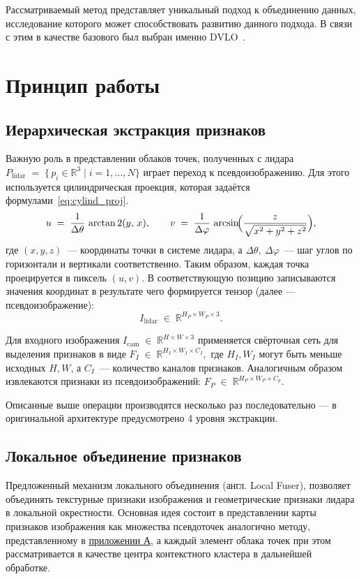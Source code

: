 Рассматриваемый метод представляет уникальный подход к объединению данных, исследование которого
может способствовать развитию данного подхода. В связи с этим в качестве базового был выбран
именно DVLO~\cite{liu2024dvlo}.

\section{Принцип работы}
\subsection{Иерархическая экстракция признаков}
Важную роль в представлении облаков точек, полученных с лидара ${P}_{\mathrm{lidar}} \;=\; \bigl\{\,{p}_i \in \mathbb{R}^3 \mid i=1,\ldots,N\bigr\}$
играет переход к псевдоизображению. Для этого используется цилиндрическая проекция, которая задаётся формулами~\eqref{eq:cylind_proj}.
\begin{equation}
  \label{eq:cylind_proj}
  u \;=\; \frac{1}{\Delta \theta}\,\arctan2(y,\,x),
  \qquad
  v \;=\; \frac{1}{\Delta \varphi}\,\arcsin\!\Bigl(\frac{z}{\sqrt{x^2 + y^2 + z^2}}\Bigr),
\end{equation}
где $(x,y,z)$~--- координаты точки в системе лидара, а
$\Delta \theta,\ \Delta \varphi$~--- шаг углов по горизонтали и вертикали соответственно.
Таким образом, каждая точка проецируется в пиксель $(u,v)$.
В соответствующую позицию записываются значения координат в результате чего формируется тензор (далее --- псевдоизображение):
\begin{equation*}
  {I}_{\mathrm{lidar}} \;\in\; \mathbb{R}^{H_P \times W_P \times 3}.
\end{equation*}

Для входного изображения ${I}_{\mathrm{cam}} \;\in\; \mathbb{R}^{H \times W \times 3}$
применяется свёрточная сеть для выделения признаков в виде ${F}_I \;\in\; \mathbb{R}^{H_{I} \times W_{I} \times C_{I}},$
где $H_{I}, W_{I}$ могут быть меньше исходных $H, W$, а $C_{I}$~--- количество каналов признаков.
Аналогичным образом извлекаются признаки из псевдоизображений: 
${F}_P \;\in\; \mathbb{R}^{H_P \times W_P \times C_{p}}$.

Описанные выше операции производятся несколько раз последовательно ---
в оригинальной архитектуре предусмотрено 4 уровня экстракции.


\subsection{Локальное объединение признаков}
\label{sec:local_fuser}
Предложенный механизм локального объединения (англ. Local Fuser), позволяет объединять текстурные 
признаки изображения и геометрические признаки лидара в локальной окрестности. 
Основная идея состоит в представлении карты признаков изображения как множества
псевдоточек аналогично методу, представленному в \hyperref[sec:set_of_points]{приложении А}, а каждый элемент облака точек при 
этом рассматривается в качестве центра контекстного кластера в дальнейшей обработке.

